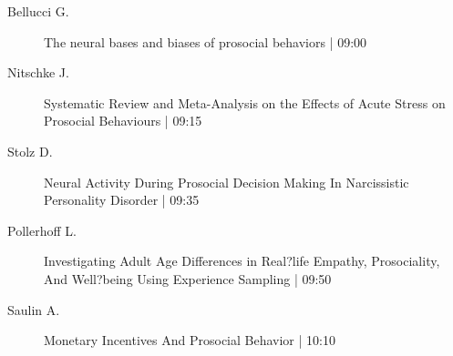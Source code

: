 
    \begin{description}    
        \item [Bellucci G.] The neural bases and biases of prosocial behaviors \textcolor{mygray}{ | 09:00}    
        \item [Nitschke J.] Systematic Review and Meta-Analysis on the Effects of Acute Stress on Prosocial Behaviours \textcolor{mygray}{ | 09:15}    
        \item [Stolz D.] Neural Activity During Prosocial Decision Making In Narcissistic Personality Disorder \textcolor{mygray}{ | 09:35}    
        \item [Pollerhoff L.] Investigating Adult Age Differences in Real?life Empathy, Prosociality, And Well?being Using Experience Sampling \textcolor{mygray}{ | 09:50}    
        \item [Saulin A.] Monetary Incentives And Prosocial Behavior \textcolor{mygray}{ | 10:10}  
    \end{description}  
        
        